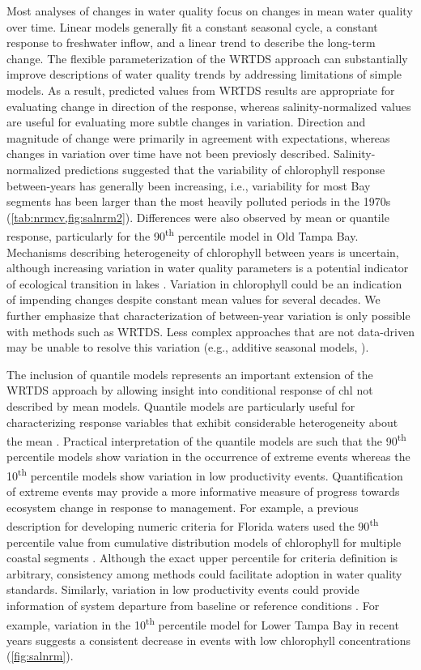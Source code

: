 \documentclass{svjour3}\usepackage[]{graphicx}\usepackage[]{color}
\newcommand{\nine}{90\textsuperscript{th} percentile }
\newcommand{\ten}{10\textsuperscript{th} percentile }
\begin{document}
Most analyses of changes in water quality focus on changes in mean water quality over time.  Linear models generally fit a constant seasonal cycle, a constant response to freshwater inflow, and a linear trend to describe the long-term change.  The flexible parameterization of the \ac{WRTDS} approach can substantially improve descriptions of water quality trends by addressing limitations of simple models.  As a result, predicted values from \ac{WRTDS} results are appropriate for evaluating change in direction of the response, whereas salinity-normalized values are useful for evaluating more subtle changes in variation.  Direction and magnitude of change were primarily in agreement with expectations, whereas changes in variation over time have not been previosly described.  Salinity-normalized predictions suggested that the variability of chlorophyll response between-years has generally been increasing, i.e., variability for most Bay segments has been larger than the most heavily polluted periods in the 1970s (\cref{tab:nrmcv,fig:salnrm2}).  Differences were also observed by mean or quantile response, particularly for the \nine model in Old Tampa Bay.  Mechanisms describing heterogeneity of chlorophyll between years is uncertain, although increasing variation in water quality parameters is a potential indicator of ecological transition in lakes \cite{Carpenter06}.   Variation in chlorophyll could be an indication of impending changes despite constant mean values for several decades.  We further emphasize that characterization of between-year variation is only possible with methods such as \ac{WRTDS}.  Less complex approaches that are not data-driven may be unable to resolve this variation (e.g., additive seasonal models, \cite{Cloern10}).     

The inclusion of quantile models represents an important extension of the \ac{WRTDS} approach by allowing insight into conditional response of \ac{chl} not described by mean models.  Quantile models are particularly useful for characterizing response variables that exhibit considerable heterogeneity about the mean \cite{Terrell96,Cade03}.  Practical interpretation of the quantile models are such that the \nine models show variation in the occurrence of extreme events whereas the \ten models show variation in low productivity events.  Quantification of extreme events may provide a more informative measure of progress towards ecosystem change in response to management.  For example, a previous description for developing numeric criteria for Florida waters used the \nine value from cumulative distribution models of chlorophyll for multiple coastal segments \cite{Schaeffer12}.  Although the exact upper percentile for criteria definition is arbitrary, consistency among methods could facilitate adoption in water quality standards.  Similarly, variation in low productivity events could provide information of system departure from baseline or reference conditions \cite{Stoddard06}. For example, variation in the \ten model for Lower Tampa Bay in recent years suggests a consistent decrease in events with low chlorophyll concentrations (\cref{fig:salnrm}).
\end{document}
